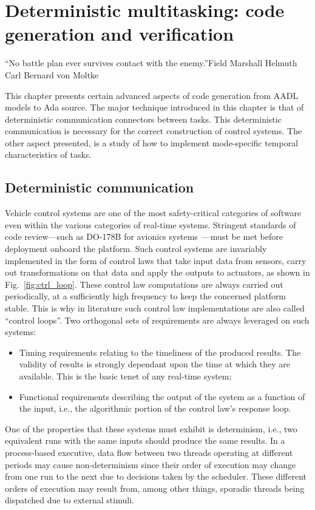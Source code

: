 \chapter{Deterministic multitasking: code generation and
  verification}{``No battle plan ever survives contact with the
  enemy.''}{Field Marshall Helmuth Carl Bernard von Moltke}
\label{chap:adv_code}

This chapter presents certain advanced aspects of code generation from
AADL models to Ada source. The major technique introduced in this
chapter is that of deterministic communication connectors between
tasks. This deterministic communication is necessary for the correct
construction of control systems. The other aspect presented, is a
study of how to implement mode-specific temporal characteristics of
tasks.

\section{Deterministic communication}
Vehicle control systems are one of the most safety-critical categories
of software even within the various categories of real-time
systems. Stringent standards of code review---such as DO-178B for
avionics systems~\cite{do178b}---must be met before deployment onboard
the platform. Such control systems are invariably implemented in the
form of control laws that take input data from sensors, carry out
transformations on that data and apply the outputs to actuators, as
shown in Fig.~\ref{fig:ctrl_loop}. These control law computations are
always carried out periodically, at a sufficiently high frequency to
keep the concerned platform stable. This is why in literature such
control law implementations are also called ``control loops''. Two
orthogonal sets of requirements are always leveraged on such systems:

\begin{itemize}
\item{Timing requirements relating to the timeliness of the produced
  results. The validity of results is strongly dependant upon the time
  at which they are available. This is the basic tenet of any
  real-time system;}
\item{Functional requirements describing the output of the system as a
  function of the input, i.e., the algorithmic portion of the control
  law's response loop.}
\end{itemize}

One of the properties that these systems must exhibit is determinism,
i.e., two equivalent runs with the same inputs should produce the same
results. In a process-based executive, data flow between two threads
operating at different periods may cause non-determinism since their
order of execution may change from one run to the next due to
decisions taken by the scheduler. These different orders of execution
may result from, among other things, sporadic threads being dispatched
due to external stimuli.

